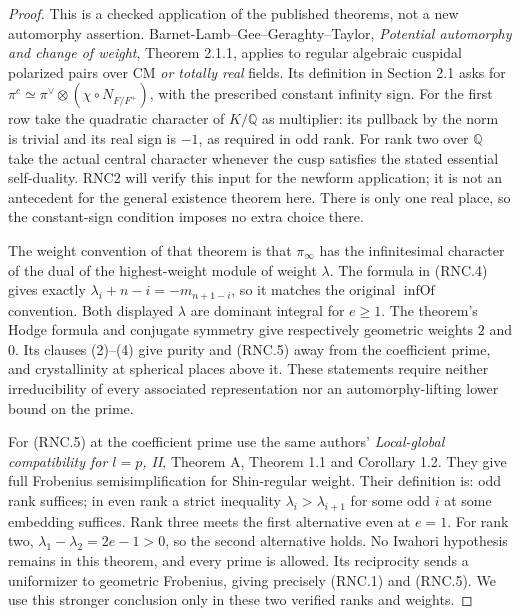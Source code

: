 \begin{proof}
This is a checked application of the published theorems, not a
new automorphy assertion.  Barnet-Lamb--Gee--Geraghty--Taylor,
\emph{Potential automorphy and change of weight}, Theorem 2.1.1,
applies to regular algebraic cuspidal polarized pairs over CM
\emph{or totally real} fields.  Its definition in Section 2.1
asks for $\pi^c\simeq\pi^\vee\otimes(\chi\circ N_{F/F^+})$,
with the prescribed constant infinity sign.  For the first row
take the quadratic character of $K/\mathbb Q$ as multiplier:
its pullback by the norm is trivial and its real sign is $-1$,
as required in odd rank.  For rank two over $\mathbb Q$ take
the actual central character whenever the cusp satisfies
the stated essential self-duality.  RNC2 will verify this
input for the newform application; it is not an antecedent
for the general existence theorem here.  There is only one real place, so the
constant-sign condition imposes no extra choice there.

The weight convention of that theorem is that $\pi_\infty$
has the infinitesimal character of the dual of the highest-weight
module of weight $\lambda$.  The formula in (RNC.4) gives exactly
$\lambda_i+n-i=-m_{n+1-i}$, so it matches the original
$\operatorname{infOf}$ convention.  Both displayed $\lambda$
are dominant integral for $e\geq1$.  The theorem's Hodge formula
and conjugate symmetry give respectively geometric weights $2$
and $0$.  Its clauses (2)--(4) give purity and (RNC.5) away from
the coefficient prime, and crystallinity at spherical places
above it.  These statements require neither irreducibility of
every associated representation nor an automorphy-lifting lower
bound on the prime.

For (RNC.5) at the coefficient prime use the same authors'
\emph{Local-global compatibility for $l=p$, II}, Theorem A,
Theorem 1.1 and Corollary 1.2.  They give full Frobenius
semisimplification for Shin-regular weight.  Their definition is:
odd rank suffices; in even rank a strict inequality
$\lambda_i>\lambda_{i+1}$ for some odd $i$ at some embedding
suffices.  Rank three meets the first alternative even at $e=1$.
For rank two, $\lambda_1-\lambda_2=2e-1>0$, so the second
alternative holds.  No Iwahori hypothesis remains in this
theorem, and every prime is allowed.  Its reciprocity sends a
uniformizer to geometric Frobenius, giving precisely (RNC.1)
and (RNC.5).  We use this stronger conclusion only in these
two verified ranks and weights.
\end{proof}

